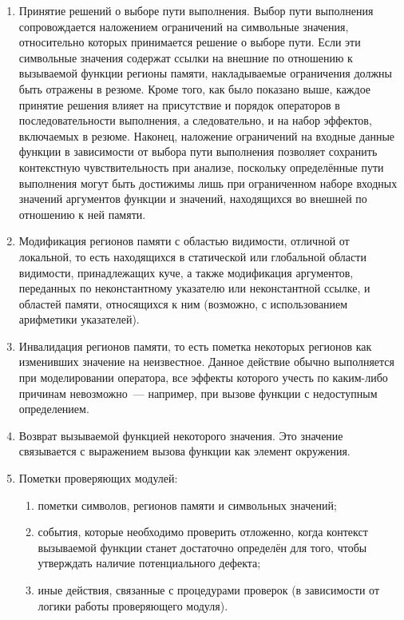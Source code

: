 \begin{enumerate}
 \item Принятие решений о выборе пути выполнения. Выбор пути выполнения сопровождается наложением ограничений на символьные значения, относительно которых принимается решение о выборе пути. Если эти символьные значения содержат ссылки на внешние по отношению к вызываемой функции регионы памяти, накладываемые ограничения должны быть отражены в резюме. Кроме того, как было показано выше, каждое принятие решения влияет на присутствие и порядок операторов в последовательности выполнения, а следовательно, и на набор эффектов, включаемых в резюме. Наконец, наложение ограничений на входные данные функции в зависимости от выбора пути выполнения позволяет сохранить контекстную чувствительность при анализе, поскольку определённые пути выполнения могут быть достижимы лишь при ограниченном наборе входных значений аргументов функции и значений, находящихся во внешней по отношению к ней памяти.
 
 \item Модификация регионов памяти с областью видимости, отличной от локальной, то есть находящихся в статической или глобальной области видимости, принадлежащих куче, а также модификация аргументов, переданных по неконстантному указателю или неконстантной ссылке, и областей памяти, относящихся к ним (возможно, с использованием арифметики указателей).
 
 \item Инвалидация регионов памяти, то есть пометка некоторых регионов как изменивших значение на неизвестное. Данное действие обычно выполняется при моделировании оператора, все эффекты которого учесть по каким-либо причинам невозможно~--- например, при вызове функции с недоступным определением.
 
 \item Возврат вызываемой функцией некоторого значения. Это значение связывается с выражением вызова функции как элемент окружения.
 
 \item Пометки проверяющих модулей:
 
 \begin{enumerate}
  \item пометки символов, регионов памяти и символьных значений;
  \item события, которые необходимо проверить отложенно, когда контекст вызываемой функции станет достаточно определён для того, чтобы утверждать наличие потенциального дефекта;
  \item иные действия, связанные с процедурами проверок (в зависимости от логики работы проверяющего модуля).
 \end{enumerate}
 
\end{enumerate}

